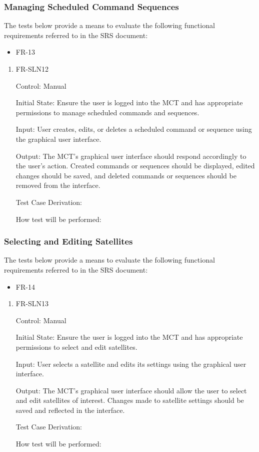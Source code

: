 \documentclass[12pt, titlepage]{article}
\begin{document}
\subsubsection{Managing Scheduled Command Sequences}

The tests below provide a means to evaluate the following functional requirements referred to in the SRS document:
\begin{itemize}
    \item FR-13
\end{itemize}

\begin{enumerate}

\item{FR-SLN12\\}

Control: Manual
					
Initial State: Ensure the user is logged into the MCT and has appropriate permissions to manage scheduled commands and sequences.
	
Input: User creates, edits, or deletes a scheduled command or sequence using the graphical user interface.
					
Output: The MCT's graphical user interface should respond accordingly to the user's action. Created commands or sequences should be displayed, edited changes should be saved, and deleted commands or sequences should be removed from the interface.

Test Case Derivation:
					
How test will be performed:

\end{enumerate}

\subsubsection{Selecting and Editing Satellites}

The tests below provide a means to evaluate the following functional requirements referred to in the SRS document:
\begin{itemize}
    \item FR-14
\end{itemize}

\begin{enumerate}

\item{FR-SLN13\\}

Control: Manual
					
Initial State: Ensure the user is logged into the MCT and has appropriate permissions to select and edit satellites.
	
Input: User selects a satellite and edits its settings using the graphical user interface.
					
Output: The MCT's graphical user interface should allow the user to select and edit satellites of interest. Changes made to satellite settings should be saved and reflected in the interface.

Test Case Derivation:
					
How test will be performed:

\end{enumerate}
\end{document}
